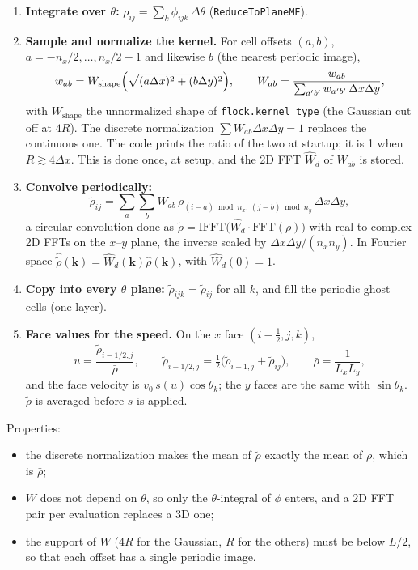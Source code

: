 \documentclass[11pt]{article}
\newcommand{\code}[1]{\texttt{#1}}
\newcommand{\rt}{\tilde\rho}
\newcommand{\rb}{\bar\rho}
\newcommand{\Wh}{\hat W}
\begin{document}
\begin{enumerate}
  \item \textbf{Integrate over $\theta$:}
        $\rho_{ij}=\sum_k\phi_{ijk}\,\Delta\theta$ (\code{ReduceToPlaneMF}).
  \item \textbf{Sample and normalize the kernel.} For cell offsets $(a,b)$,
        $a=-n_x/2,\dots,n_x/2-1$ and likewise $b$ (the nearest periodic
        image),
        \begin{equation}
          w_{ab}=W_{\mathrm{shape}}\Bigl(\sqrt{(a\Delta x)^2+(b\Delta y)^2}\Bigr),\qquad
          W_{ab}=\frac{w_{ab}}{\sum_{a'b'}w_{a'b'}\,\Delta x\Delta y},
        \end{equation}
        with $W_{\mathrm{shape}}$ the unnormalized shape of
        \code{flock.kernel\_type} (the Gaussian cut off at $4R$). The discrete
        normalization $\sum W_{ab}\Delta x\Delta y=1$ replaces the continuous
        one. The code prints the ratio of the two at startup; it is 1 when
        $R\gtrsim4\Delta x$. This is done once, at setup, and the 2D FFT
        $\Wh_d$ of $W_{ab}$ is stored.
  \item \textbf{Convolve periodically:}
        \begin{equation}
          \rt_{ij}=\sum_{a}\sum_{b}W_{ab}\,
          \rho_{(i-a)\bmod n_x,\,(j-b)\bmod n_y}\,\Delta x\Delta y ,
        \end{equation}
        a circular convolution done as
        $\rt=\mathrm{IFFT}\bigl(\Wh_d\cdot\mathrm{FFT}(\rho)\bigr)$ with
        real-to-complex 2D FFTs on the $x$--$y$ plane, the inverse scaled by
        $\Delta x\Delta y/(n_xn_y)$. In Fourier space
        $\hat{\rt}(\mathbf k)=\Wh_d(\mathbf k)\hat\rho(\mathbf k)$, with
        $\Wh_d(0)=1$.
  \item \textbf{Copy into every $\theta$ plane:} $\rt_{ijk}=\rt_{ij}$ for all
        $k$, and fill the periodic ghost cells (one layer).
  \item \textbf{Face values for the speed.} On the $x$ face $(i-\tfrac12,j,k)$,
        \begin{equation}
          u=\frac{\rt_{i-1/2,j}}{\rb},\qquad
          \rt_{i-1/2,j}=\tfrac12\bigl(\rt_{i-1,j}+\rt_{ij}\bigr),\qquad
          \rb=\frac1{L_xL_y},
        \end{equation}
        and the face velocity is $v_0\,s(u)\cos\theta_k$; the $y$ faces are
        the same with $\sin\theta_k$. $\rt$ is averaged before $s$ is applied.
\end{enumerate}
Properties:
\begin{itemize}[nosep]
  \item the discrete normalization makes the mean of $\rt$ exactly the mean of
        $\rho$, which is $\rb$;
  \item $W$ does not depend on $\theta$, so only the $\theta$-integral of $\phi$
        enters, and a 2D FFT pair per evaluation replaces a 3D one;
  \item the support of $W$ ($4R$ for the Gaussian, $R$ for the others) must be
        below $L/2$, so that each offset has a single periodic image.
\end{itemize}
\end{document}

